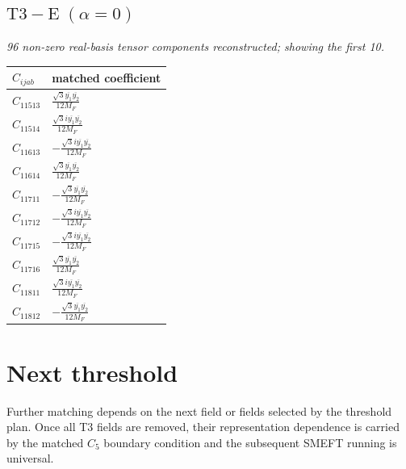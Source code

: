 \documentclass[9pt]{article}
\begin{document}
\subsection*{$ \mathrm{T3-E}\;(\alpha=0) $}
\textit{96 non-zero real-basis tensor components reconstructed; showing the first 10.}
\begin{longtable}{@{}ll@{}}
\toprule
$C_{ijab}$ & matched coefficient \\
\midrule
$C_{11513}$ & $ \frac{\sqrt{3} \overline{y_{1}} \overline{y_{2}}}{12 M_F} $ \\
$C_{11514}$ & $ \frac{\sqrt{3} i \overline{y_{1}} \overline{y_{2}}}{12 M_F} $ \\
$C_{11613}$ & $ - \frac{\sqrt{3} i \overline{y_{1}} \overline{y_{2}}}{12 M_F} $ \\
$C_{11614}$ & $ \frac{\sqrt{3} \overline{y_{1}} \overline{y_{2}}}{12 M_F} $ \\
$C_{11711}$ & $ - \frac{\sqrt{3} \overline{y_{1}} \overline{y_{2}}}{12 M_F} $ \\
$C_{11712}$ & $ - \frac{\sqrt{3} i \overline{y_{1}} \overline{y_{2}}}{12 M_F} $ \\
$C_{11715}$ & $ - \frac{\sqrt{3} i \overline{y_{1}} \overline{y_{2}}}{12 M_F} $ \\
$C_{11716}$ & $ \frac{\sqrt{3} \overline{y_{1}} \overline{y_{2}}}{12 M_F} $ \\
$C_{11811}$ & $ \frac{\sqrt{3} i \overline{y_{1}} \overline{y_{2}}}{12 M_F} $ \\
$C_{11812}$ & $ - \frac{\sqrt{3} \overline{y_{1}} \overline{y_{2}}}{12 M_F} $ \\
\bottomrule
\end{longtable}
\section*{Next threshold}
Further matching depends on the next field or fields selected by the threshold plan.  Once all T3 fields are removed, their representation dependence is carried by the matched $C_5$ boundary condition and the subsequent SMEFT running is universal.
\end{document}
